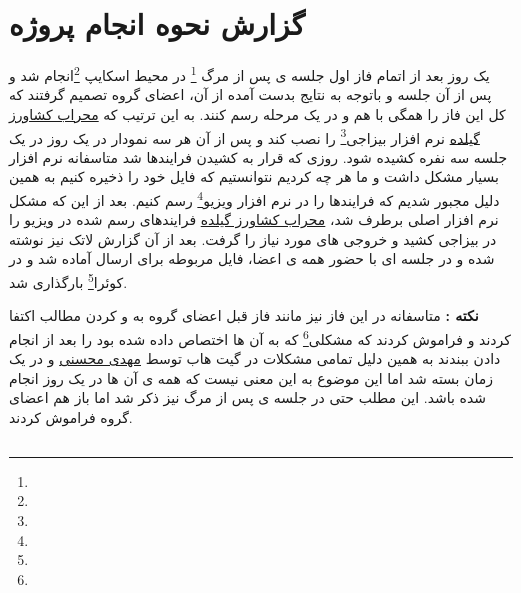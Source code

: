 \documentclass[12pt,a4paper]{article}
\begin{document}
\section{گزارش نحوه انجام پروژه} \label{section.report}
یک روز بعد از اتمام فاز اول جلسه ی پس از مرگ \footnote{} در محیط اسکایپ \footnote{}انجام شد و پس از آن جلسه و باتوجه به نتایج بدست آمده از آن، اعضای گروه تصمیم گرفتند که کل این فاز را همگی با هم و در یک مرحله رسم کنند. به این ترتیب که \underline{محراب کشاورز گیلده} نرم افزار بیزاجی\footnote{} را نصب کند و پس از آن هر سه نمودار در یک روز در یک جلسه سه نفره کشیده شود. روزی که قرار به کشیدن فرایندها شد متاسفانه نرم افزار بسیار مشکل داشت و ما هر چه کردیم نتوانستیم که فایل خود را ذخیره کنیم به همین دلیل مجبور شدیم که فرایندها را در نرم افزار ویزیو\footnote{} رسم کنیم. بعد از این که مشکل نرم افزار اصلی برطرف شد، \underline{محراب کشاورز گیلده} فرایندهای رسم شده در ویزیو را در بیزاجی کشید و خروجی های مورد نیاز را گرفت. بعد از آن گزارش لاتک نیز نوشته شده و در جلسه ای با حضور همه ی اعضا، فایل مربوطه برای ارسال آماده شد و در کوئرا\footnote{} بارگذاری شد.


\textbf{نکته :} متاسفانه در این فاز نیز مانند فاز قبل اعضای گروه به  و  کردن مطالب اکتفا کردند و فراموش کردند که مشکلی\footnote{} که به آن ها اختصاص داده شده بود را بعد از انجام دادن ببندند به همین دلیل تمامی مشکلات در گیت هاب توسط \underline{مهدی محسنی} و در یک زمان بسته شد اما این موضوع به این معنی نیست که همه ی آن ها در یک روز انجام شده باشد. این مطلب حتی در جلسه ی پس از مرگ نیز ذکر شد اما باز هم اعضای گروه فراموش کردند.
\pagebreak

\subsection{} \label{section.report.taskBoard}
\end{document}
